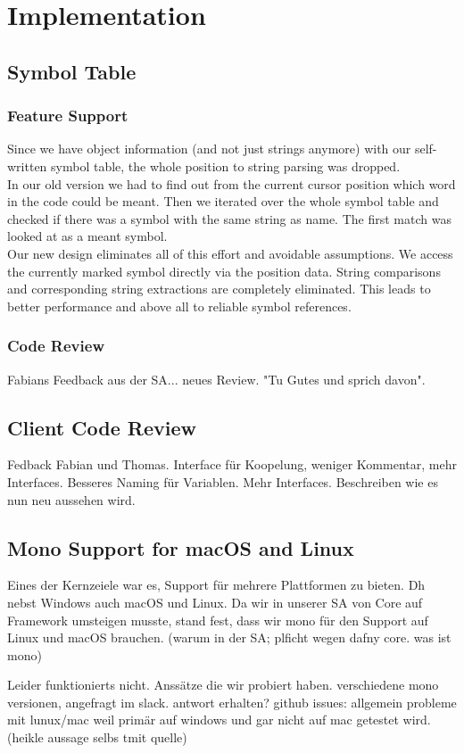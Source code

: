 \section{Implementation}

\subsection{Symbol Table}

\subsubsection{Feature Support}
Since we have object information (and not just strings anymore) with our self-written symbol table,
the whole position to string parsing was dropped. \\

In our old version we had to find out from the current cursor position which word in the code could be meant.
Then we iterated over the whole symbol table and checked if there was a symbol with the same string as name.
The first match was looked at as a meant symbol. \\

Our new design eliminates all of this effort and avoidable assumptions.
We access the currently marked symbol directly via the position data.
String comparisons and corresponding string extractions are completely eliminated.
This leads to better performance and above all to reliable symbol references.

\subsubsection{Code Review}
Fabians Feedback aus der SA... neues Review. "Tu Gutes und sprich davon".

\subsection{Client Code Review}
Fedback Fabian und Thomas. Interface für Koopelung, weniger Kommentar, mehr Interfaces. Besseres Naming für Variablen. Mehr Interfaces.
Beschreiben wie es nun neu aussehen wird.

\subsection{Mono Support for macOS and Linux}
Eines der Kernzeiele war es, Support für mehrere Plattformen zu bieten. Dh nebst Windows auch macOS und Linux.
Da wir in unserer SA von Core auf Framework umsteigen musste, stand fest, dass wir mono für den Support auf Linux und macOS brauchen.
(warum in der SA; plficht wegen dafny core. was ist mono)

Leider funktionierts nicht.
Anssätze die wir probiert haben. verschiedene mono versionen, angefragt im slack. antwort erhalten?
github issues: allgemein probleme mit lunux/mac weil primär auf windows und gar nicht auf mac getestet wird. (heikle aussage selbs tmit quelle) 

\cite{sa}
\cite{mono-slack}
\cite{mono-git}
